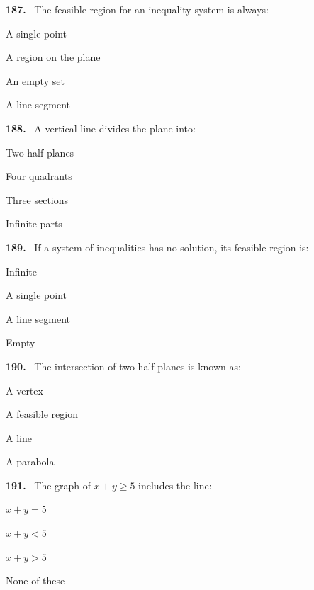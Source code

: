 \documentclass[11pt]{article}
\newenvironment{qenv}[1]{%
  \par\medskip\noindent\textbf{#1.}\ \ignorespaces
}{\par}
\begin{document}
\begin{qenv}{187} The feasible region for an inequality system is always:
\begin{options} \item A single point \item A region on the plane \item An empty set \item A line segment \end{options} \end{qenv}

\begin{qenv}{188} A vertical line divides the plane into:
\begin{options} \item Two half-planes \item Four quadrants \item Three sections \item Infinite parts \end{options} \end{qenv}

\begin{qenv}{189} If a system of inequalities has no solution, its feasible region is:
\begin{options} \item Infinite \item A single point \item A line segment \item Empty \end{options} \end{qenv}

\begin{qenv}{190} The intersection of two half-planes is known as:
\begin{options} \item A vertex \item A feasible region \item A line \item A parabola \end{options} \end{qenv}

\begin{qenv}{191} The graph of $x+y \geq 5$ includes the line:
\begin{options} \item $x+y=5$ \item $x+y<5$ \item $x+y>5$ \item None of these \end{options} \end{qenv}
\end{document}
